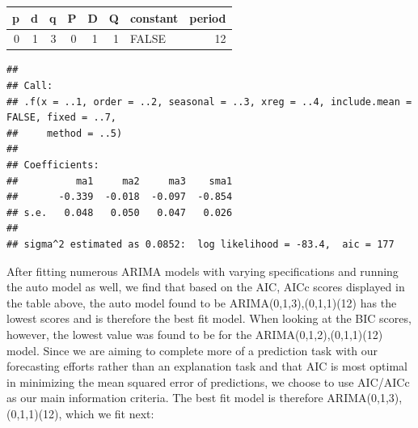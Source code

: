 \documentclass[AER]{AEA}
\newenvironment{Shaded}{\begin{snugshade}}{\end{snugshade}}
\newcommand{\DecValTok}[1]{\textcolor[rgb]{0.00,0.00,0.81}{#1}}
\newcommand{\FunctionTok}[1]{\textcolor[rgb]{0.00,0.00,0.00}{#1}}
\newcommand{\NormalTok}[1]{#1}
\newcommand{\SpecialCharTok}[1]{\textcolor[rgb]{0.00,0.00,0.00}{#1}}
\begin{document}
\begin{Shaded}
\end{Shaded}

\begin{longtable}[]{@{}rrrrrrlr@{}}
\toprule
p & d & q & P & D & Q & constant & period \\
\midrule
\endhead
0 & 1 & 3 & 0 & 1 & 1 & FALSE & 12 \\
\bottomrule
\end{longtable}

\begin{Shaded}
\end{Shaded}

\begin{verbatim}
## 
## Call:
## .f(x = ..1, order = ..2, seasonal = ..3, xreg = ..4, include.mean = FALSE, fixed = ..7, 
##     method = ..5)
## 
## Coefficients:
##          ma1     ma2     ma3    sma1
##       -0.339  -0.018  -0.097  -0.854
## s.e.   0.048   0.050   0.047   0.026
## 
## sigma^2 estimated as 0.0852:  log likelihood = -83.4,  aic = 177
\end{verbatim}

After fitting numerous ARIMA models with varying specifications and
running the auto model as well, we find that based on the AIC, AICc
scores displayed in the table above, the auto model found to be
ARIMA(0,1,3),(0,1,1)(12) has the lowest scores and is therefore the best
fit model. When looking at the BIC scores, however, the lowest value was
found to be for the ARIMA(0,1,2),(0,1,1)(12) model. Since we are aiming
to complete more of a prediction task with our forecasting efforts
rather than an explanation task and that AIC is most optimal in
minimizing the mean squared error of predictions, we choose to use
AIC/AICc as our main information criteria. The best fit model is
therefore ARIMA(0,1,3),(0,1,1)(12), which we fit next:
\end{document}
